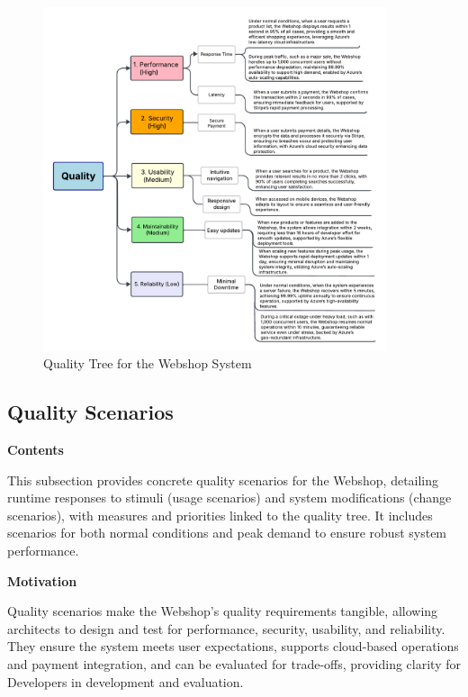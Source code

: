 \begin{figure}[h]
  \centering
  \includegraphics[width=0.9\textwidth]{images/quality-tree.pdf}
  \caption{Quality Tree for the Webshop System}
  \label{fig:webshop-quality-tree}
\end{figure}

\hypertarget{_quality_scenarios}{%
\subsection{Quality Scenarios}\label{_quality_scenarios}}

\textbf{Contents}

This subsection provides concrete quality scenarios for the Webshop, detailing runtime responses to stimuli (usage scenarios) and system modifications (change scenarios), with measures and priorities linked to the quality tree. It includes scenarios for both normal conditions and peak demand to ensure robust system performance.

\textbf{Motivation}

Quality scenarios make the Webshop’s quality requirements tangible, allowing architects to design and test for performance, security, usability, and reliability. They ensure the system meets user expectations, supports cloud-based operations and payment integration, and can be evaluated for trade-offs, providing clarity for Developers in development and evaluation.

